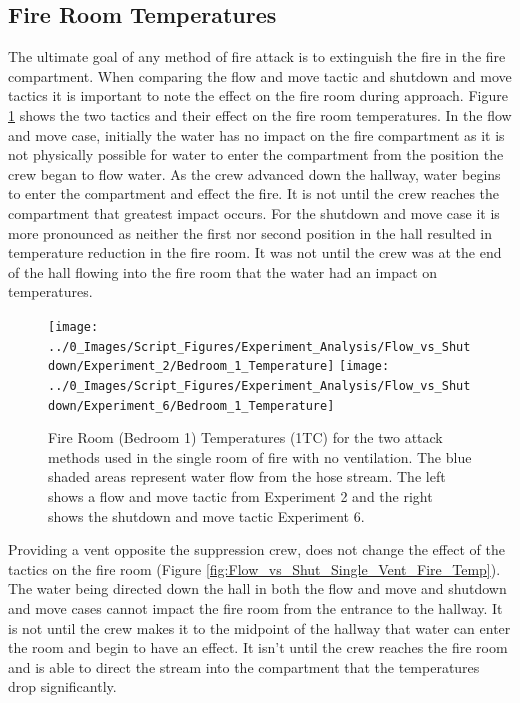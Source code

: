 \documentclass[12pt,oneside]{book}
\begin{document}
\subsection{Fire Room Temperatures}
The ultimate goal of any method of fire attack is to extinguish the fire in the fire compartment. When comparing the flow and move tactic and shutdown and move tactics it is important to note the effect on the fire room during approach. Figure \ref{fig:Flow_vs_Shut_Single_No_Vent_Fire_Temp} shows the two tactics and their effect on the fire room temperatures. In the flow and move case, initially the water has no impact on the fire compartment as it is not physically possible for water to enter the compartment from the position the crew began to flow water. As the crew advanced down the hallway, water begins to enter the compartment and effect the fire. It is not until the crew reaches the compartment that greatest impact occurs. For the shutdown and move case it is more pronounced as neither the first nor second position in the hall resulted in temperature reduction in the fire room. It was not until the crew was at the end of the hall flowing into the fire room that the water had an impact on temperatures. 

\begin{figure}[H]
\centering
\texttt{[image: ../0\_Images/Script\_Figures/Experiment\_Analysis/Flow\_vs\_Shutdown/Experiment\_2/Bedroom\_1\_Temperature]}
\texttt{[image: ../0\_Images/Script\_Figures/Experiment\_Analysis/Flow\_vs\_Shutdown/Experiment\_6/Bedroom\_1\_Temperature]}
\caption[Bedroom 1 Temp. - No Vent - Flow \& Move vs. Shutdown \& Move]{Fire Room (Bedroom 1) Temperatures (1TC) for the two attack methods used in the single room of fire with no ventilation. The blue shaded areas represent water flow from the hose stream. The left shows a flow and move tactic from Experiment 2 and the right shows the shutdown and move tactic Experiment 6.}
\label{fig:Flow_vs_Shut_Single_No_Vent_Fire_Temp}
\end{figure}

Providing a vent opposite the suppression crew, does not change the effect of the tactics on the fire room (Figure \ref{fig:Flow_vs_Shut_Single_Vent_Fire_Temp}).  The water being directed down the hall in both the flow and move and shutdown and move cases cannot impact the fire room from the entrance to the hallway. It is not until the crew makes it to the midpoint of the hallway that water can enter the room and begin to have an effect. It isn't until the crew reaches the fire room and is able to direct the stream into the compartment that the temperatures drop significantly.  
\end{document}
